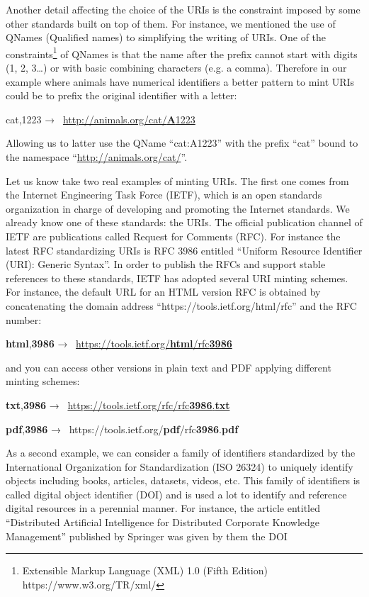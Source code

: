Another detail affecting the choice of the URIs is the constraint
imposed by some other standards built on top of them. For instance, we
mentioned the use of QNames (Qualified names) to simplifying the writing
of URIs. One of the constraints\footnote{Extensible Markup Language
  (XML) 1.0 (Fifth Edition) https://www.w3.org/TR/xml/} of QNames is
that the name after the prefix cannot start with digits (1, 2,
3\ldots{}) or with basic combining characters (e.g. a comma). Therefore
in our example where animals have numerical identifiers a better pattern
to mint URIs could be to prefix the original identifier with a letter:

cat,1223 →~
\href{http://animals.org/cat/A1223}{http://animals.org/cat/\textbf{A}1223}

Allowing us to latter use the QName ``cat:A1223'' with the prefix
``cat'' bound to the namespace ``\url{http://animals.org/cat/}''.

Let us know take two real examples of minting URIs. The first one comes
from the Internet Engineering Task Force (IETF), which is an open
standards organization in charge of developing and promoting the
Internet standards. We already know one of these standards: the URIs.
The official publication channel of IETF are publications called Request
for Comments (RFC). For instance the latest RFC standardizing URIs is
RFC 3986 entitled ``Uniform Resource Identifier (URI): Generic Syntax''.
In order to publish the RFCs and support stable references to these
standards, IETF has adopted several URI minting schemes. For instance,
the default URL for an HTML version RFC is obtained by concatenating the
domain address ``https://tools.ietf.org/html/rfc'' and the RFC number:

\textbf{html},\textbf{3986} →~
\href{https://tools.ietf.org/html/rfc3986}{https://tools.ietf.org/\textbf{html}/rfc\textbf{3986}}

and you can access other versions in plain text and PDF applying
different minting schemes:

\textbf{txt},\textbf{3986} →~
\href{https://tools.ietf.org/rfc/rfc3986.txt}{https://tools.ietf.org/rfc/rfc\textbf{3986}.\textbf{txt}}

\textbf{pdf},\textbf{3986} →~
https://tools.ietf.org/\textbf{pdf}/rfc\textbf{3986}.\textbf{pdf}

As a second example, we can consider a family of identifiers
standardized by the International Organization for Standardization (ISO
26324) to uniquely identify objects including books, articles, datasets,
videos, etc. This family of identifiers is called digital object
identifier (DOI) and is used a lot to identify and reference digital
resources in a perennial manner. For instance, the article entitled
``Distributed Artificial Intelligence for Distributed Corporate
Knowledge Management'' published by Springer was given by them the DOI

